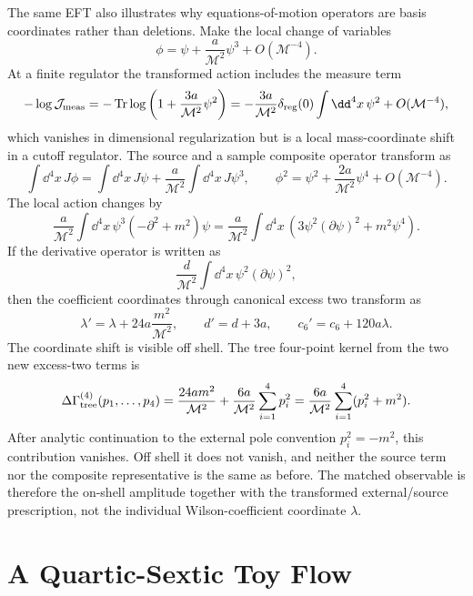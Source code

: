 The same EFT also illustrates why equations-of-motion operators are basis
coordinates rather than deletions.  Make the local change of variables
\begin{equation}
  \phi
  =
  \psi+\frac{a}{\mathcal M^2}\psi^3
  +
  O(\mathcal M^{-4}).
  \label{eq:scalar-eft-local-field-redefinition}
\end{equation}
At a finite regulator the transformed action includes the measure term
\[
  -\log \mathcal J_{\rm meas}
  =
  -\operatorname{Tr}
  \log\left(1+\frac{3a}{\mathcal M^2}\psi^2\right)
  =
  -\frac{3a}{\mathcal M^2}\delta_{\rm reg}(0)
  \int\dd^4x\,\psi^2
  +
  O(\mathcal M^{-4}),
\]
which vanishes in dimensional regularization but is a local mass-coordinate
shift in a cutoff regulator.  The source and a sample composite operator
transform as
\[
  \int\dd^4x\,J\phi
  =
  \int\dd^4x\,J\psi
  +
  \frac{a}{\mathcal M^2}\int\dd^4x\,J\psi^3,
  \qquad
  \phi^2
  =
  \psi^2+\frac{2a}{\mathcal M^2}\psi^4+O(\mathcal M^{-4}).
\]
The local action changes by
\[
  \frac{a}{\mathcal M^2}
  \int\dd^4x\,
  \psi^3(-\partial^2+m^2)\psi
  =
  \frac{a}{\mathcal M^2}
  \int\dd^4x\,
  \left(3\psi^2(\partial\psi)^2+m^2\psi^4\right).
\]
If the derivative operator is written as
\[
  \frac{d}{\mathcal M^2}\int\dd^4x\,\psi^2(\partial\psi)^2,
\]
then the coefficient coordinates through canonical excess two transform as
\begin{equation}
  \lambda'
  =
  \lambda+24a\frac{m^2}{\mathcal M^2},
  \qquad
  d'=d+3a,
  \qquad
  c_6'=c_6+120a\lambda .
  \label{eq:scalar-eft-field-redefinition-coordinates}
\end{equation}
The coordinate shift is visible off shell.  The tree four-point kernel from
the two new excess-two terms is
\[
  \Delta\Gamma^{(4)}_{\rm tree}(p_1,\ldots,p_4)
  =
  \frac{24am^2}{\mathcal M^2}
  +
  \frac{6a}{\mathcal M^2}\sum_{i=1}^4p_i^2
  =
  \frac{6a}{\mathcal M^2}
  \sum_{i=1}^4(p_i^2+m^2).
\]
After analytic continuation to the external pole convention
\(p_i^2=-m^2\), this contribution vanishes.  Off shell it does not vanish,
and neither the source term nor the composite representative is the same as
before.  The matched observable is therefore the on-shell amplitude together
with the transformed external/source prescription, not the individual
Wilson-coefficient coordinate \(\lambda\).

\section{A Quartic-Sextic Toy Flow}

